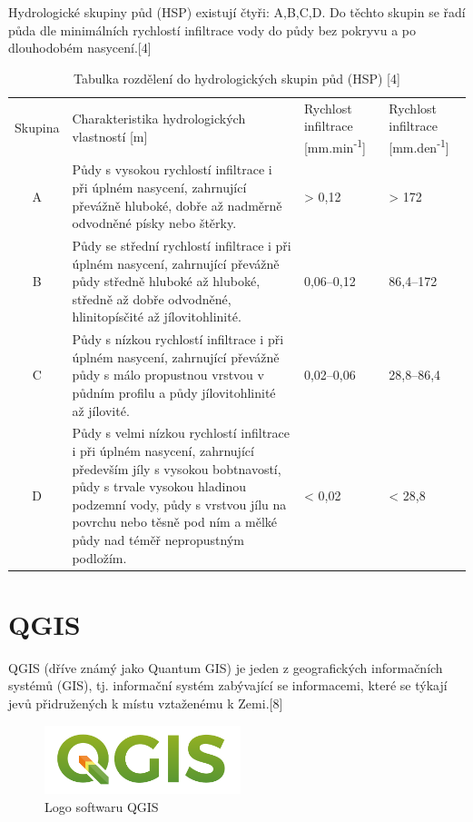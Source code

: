 \documentclass[a4paper,oneside,12pt]{book}
\begin{document}
\hspace{10mm} Hydrologické skupiny půd (HSP) existují čtyři: A,B,C,D. Do těchto skupin se řadí půda dle minimálních rychlostí infiltrace vody do půdy bez pokryvu a po dlouhodobém nasycení.[4]
\begin{table}[htbp]
  \centering
  \caption{Tabulka rozdělení do hydrologických skupin půd (HSP) [4]} 
  \label{tab:HSP}
  \begin{tabular}{|c|p{6cm}|p{2.5cm}|p{2.5cm}|}
    \hline
    Skupina & Charakteristika hydrologických vlastností [m] & 
    Rychlost infiltrace [mm.min\textsuperscript{-1}] & Rychlost infiltrace [mm.den\textsuperscript{-1}] \\
    \hhline{=|=|=|=|}
    A & Půdy s vysokou rychlostí infiltrace i při úplném nasycení, zahrnující převážně hluboké, dobře až nadměrně odvodněné písky nebo štěrky. & > 0,12 & > 172 \\
    \hline
    B & Půdy se střední rychlostí infiltrace i při úplném nasycení, zahrnující převážně půdy středně hluboké až hluboké, středně až dobře odvodněné, hlinitopísčité až jílovitohlinité. & 0,06–0,12 & 86,4–172 \\
    \hline
    C & Půdy s nízkou rychlostí infiltrace i při úplném nasycení, zahrnující převážně půdy s málo propustnou vrstvou v půdním profilu a půdy jílovitohlinité až jílovité. & 0,02–0,06 & 28,8–86,4 \\
    \hline
    D & Půdy s velmi nízkou rychlostí infiltrace i při úplném nasycení, zahrnující především jíly s vysokou bobtnavostí, půdy s trvale vysokou hladinou podzemní vody, půdy s vrstvou jílu na povrchu nebo těsně pod ním a mělké půdy nad téměř nepropustným podložím. & < 0,02 & < 28,8 \\
    \hline
  \end{tabular}
  
\end{table}

\newpage
\chapter{QGIS} \label{qgis}
\hspace{10mm} QGIS (dříve známý jako Quantum GIS) je jeden z geografických informačních systémů (GIS), tj.  informační systém zabývající se informacemi, které se týkají jevů přidružených k místu vztaženému k Zemi.[8]

\begin{figure}[ht] \label{obr2}
\centering
\includegraphics[height=2cm]{pictures/qgis-logo.png}
\caption{Logo softwaru QGIS}
\label{fig:QGIS}
\end{figure}
\end{document}
